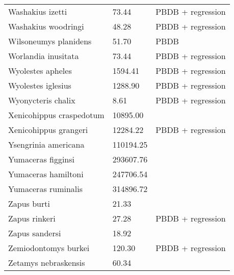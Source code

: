\begin{center}
\begin{longtable}{p{} p{} p{} }
  Washakius izetti & 73.44 & PBDB + regression \\ 
  Washakius woodringi & 48.28 & PBDB + regression \\ 
  Wilsoneumys planidens & 51.70 & PBDB \\ 
  Worlandia inusitata & 73.44 & PBDB + regression \\ 
  Wyolestes apheles & 1594.41 & PBDB + regression \\ 
  Wyolestes iglesius & 1288.90 & PBDB + regression \\ 
  Wyonycteris chalix & 8.61 & PBDB + regression \\ 
  Xenicohippus craspedotum & 10895.00 & \cite{McKenna2011} \\ 
  Xenicohippus grangeri & 12284.22 & PBDB + regression \\ 
  Ysengrinia americana & 110194.25 & \cite{Tomiya2013} \\ 
  Yumaceras figginsi & 293607.76 & \cite{Tomiya2013} \\ 
  Yumaceras hamiltoni & 247706.54 & \cite{Tomiya2013} \\ 
  Yumaceras ruminalis & 314896.72 & \cite{Tomiya2013} \\ 
  Zapus burti & 21.33 & \cite{Tomiya2013} \\ 
  Zapus rinkeri & 27.28 & PBDB + regression \\ 
  Zapus sandersi & 18.92 & \cite{Tomiya2013} \\ 
  Zemiodontomys burkei & 120.30 & PBDB + regression \\ 
  Zetamys nebraskensis & 60.34 & \cite{Tomiya2013} \\ 
  \end{longtable}
\end{center}

